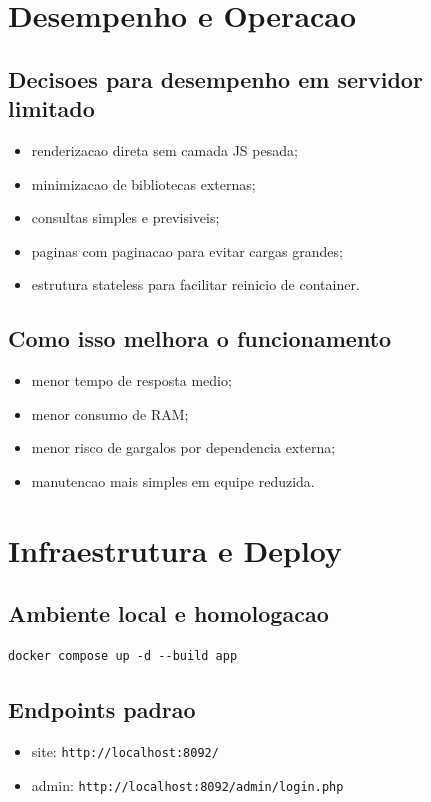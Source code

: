 \documentclass[12pt,a4paper]{article}
\begin{document}
\section{Desempenho e Operacao}
\subsection{Decisoes para desempenho em servidor limitado}
\begin{itemize}
\item renderizacao direta sem camada JS pesada;
\item minimizacao de bibliotecas externas;
\item consultas simples e previsiveis;
\item paginas com paginacao para evitar cargas grandes;
\item estrutura stateless para facilitar reinicio de container.
\end{itemize}

\subsection{Como isso melhora o funcionamento}
\begin{itemize}
\item menor tempo de resposta medio;
\item menor consumo de RAM;
\item menor risco de gargalos por dependencia externa;
\item manutencao mais simples em equipe reduzida.
\end{itemize}

\section{Infraestrutura e Deploy}
\subsection{Ambiente local e homologacao}
\begin{verbatim}
docker compose up -d --build app
\end{verbatim}

\subsection{Endpoints padrao}
\begin{itemize}
\item site: \texttt{http://localhost:8092/}
\item admin: \texttt{http://localhost:8092/admin/login.php}
\end{itemize}
\end{document}

